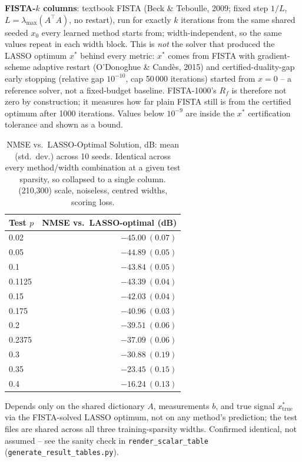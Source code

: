 \begin{table}[htbp]
\begin{minipage}{\linewidth}
\textbf{FISTA-$k$ columns}: textbook FISTA (Beck \& Teboulle, 2009; fixed step $1/L$, $L = \lambda_{\max}(A^\top A)$, no restart), run for exactly $k$ iterations from the same shared seeded $x_0$ every learned method starts from; width-independent, so the same values repeat in each width block. This is \emph{not} the solver that produced the LASSO optimum $x^*$ behind every metric: $x^*$ comes from FISTA with gradient-scheme adaptive restart (O'Donoghue \& Cand\`es, 2015) and certified-duality-gap early stopping (relative gap $10^{-10}$, cap 50\,000 iterations) started from $x = 0$ -- a reference solver, not a fixed-budget baseline. FISTA-1000's $R_f$ is therefore not zero by construction; it measures how far plain FISTA still is from the certified optimum after 1000 iterations. Values below $10^{-9}$ are inside the $x^*$ certification tolerance and shown as a bound.
\end{minipage}
\end{table}

\begin{table}[htbp]
\centering
\caption{NMSE vs.\ LASSO-Optimal Solution, dB: mean (std.\ dev.) across 10 seeds. Identical across every method/width combination at a given test sparsity, so collapsed to a single column. (210,300) scale, noiseless, centred widths, scoring loss.}
\label{tab:exp2try3so-nmse-lassoopt}
\begin{tabular}{@{} l r @{}}
\toprule
Test $p$ & NMSE vs.\ LASSO-optimal (dB) \\
\midrule
0.02 & $-45.00\ (0.07)$ \\
0.05 & $-44.89\ (0.05)$ \\
0.1 & $-43.84\ (0.05)$ \\
0.1125 & $-43.39\ (0.04)$ \\
0.15 & $-42.03\ (0.04)$ \\
0.175 & $-40.96\ (0.03)$ \\
0.2 & $-39.51\ (0.06)$ \\
0.2375 & $-37.09\ (0.06)$ \\
0.3 & $-30.88\ (0.19)$ \\
0.35 & $-23.45\ (0.15)$ \\
0.4 & $-16.24\ (0.13)$ \\
\bottomrule
\end{tabular}
\vspace{2pt}
\begin{minipage}{\linewidth}\footnotesize
Depends only on the shared dictionary $A$, measurements $b$, and true signal $x^*_{\text{true}}$ via the FISTA-solved LASSO optimum, not on any method's prediction; the test files are shared across all three training-sparsity widths. Confirmed identical, not assumed -- see the sanity check in \texttt{render\_scalar\_table} (\texttt{generate\_result\_tables.py}).
\end{minipage}
\end{table}
